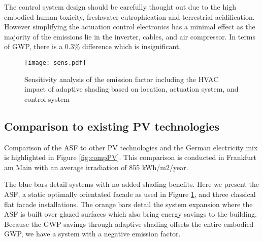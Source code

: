 The control system design should be carefully thought out due to the high embodied human toxicity, freshwater eutrophication and terrestrial acidification. However simplifying the actuation control electronics has a minimal effect as the majority of the emissions lie in the inverter, cables, and air compressor. In terms of GWP, there is a 0.3\% difference which is insignificant.



\begin{figure}[H]
\begin{center}
\texttt{[image: sens.pdf]}
\caption{Sensitivity analysis of the emission factor including the HVAC impact of adaptive shading based on location, actuation system, and control system}
\label{fig:sens}
\end{center}
\end{figure}

\subsection{Comparison to existing PV technologies}

Comparison of the ASF to other PV technologies and the German electricity mix is highlighted in Figure \ref{fig:compPV}. This comparison is conducted in Frankfurt am Main with an average irradiation of 855 kWh/m$2$/year.\

The blue bars detail systems with no added shading benefits. Here we present the ASF, a static optimally orientated facade as used in Figure \ref{fig:sens}, and three classical flat facade installations.  
The orange bars detail the system expansion where the ASF is built over glazed surfaces which also bring energy savings to the building. Because the GWP savings through adaptive shading offsets the entire embodied GWP, we have a system with a negative emission factor.



